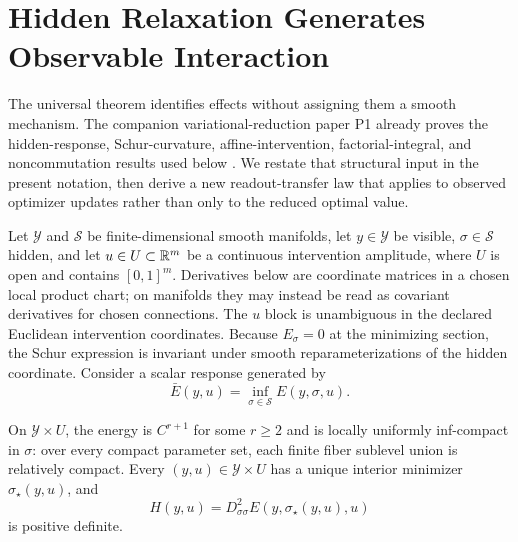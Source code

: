 \section{Hidden Relaxation Generates Observable Interaction}
\label{sec:hidden-relaxation}

The universal theorem identifies effects without assigning them a smooth mechanism.  The companion variational-reduction paper P1 already proves the hidden-response, Schur-curvature, affine-intervention, factorial-integral, and noncommutation results used below \citep{li2026optimizationgeometrodynamics}.  We restate that structural input in the present notation, then derive a new readout-transfer law that applies to observed optimizer updates rather than only to the reduced optimal value.

Let $\mathcal Y$ and $\mathcal S$ be finite-dimensional smooth manifolds, let $y\in\mathcal Y$ be visible, $\sigma\in\mathcal S$ hidden, and let $u\in U\subset\mathbb R^m$ be a continuous intervention amplitude, where $U$ is open and contains $[0,1]^m$.  Derivatives below are coordinate matrices in a chosen local product chart; on manifolds they may instead be read as covariant derivatives for chosen connections.  The $u$ block is unambiguous in the declared Euclidean intervention coordinates.  Because $E_\sigma=0$ at the minimizing section, the Schur expression is invariant under smooth reparameterizations of the hidden coordinate.
Consider a scalar response generated by
\begin{equation}
\bar E(y,u)=\inf_{\sigma\in\mathcal S}E(y,\sigma,u).
\label{eq:reduced-intervention-energy}
\end{equation}

\begin{assumption}
\label{ass:regular-relaxation}
On $\mathcal Y\times U$, the energy is $C^{r+1}$ for some $r\ge2$ and is locally uniformly inf-compact in $\sigma$: over every compact parameter set, each finite fiber sublevel union is relatively compact.  Every $(y,u)\in\mathcal Y\times U$ has a unique interior minimizer $\sigma_\star(y,u)$, and
\[
H(y,u)=D^2_{\sigma\sigma}E(y,\sigma_\star(y,u),u)
\]
is positive definite.
\end{assumption}


